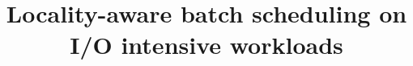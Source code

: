 \documentclass[conference,10pt]{IEEEtran}
\begin{document}
\title{Locality-aware batch scheduling on I/O intensive workloads}

\maketitle


\begin{abstract}






\end{abstract}
\end{document}
